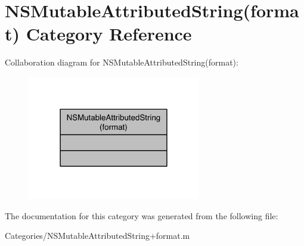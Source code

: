 \hypertarget{category_n_s_mutable_attributed_string_07format_08}{\section{N\-S\-Mutable\-Attributed\-String(format) Category Reference}
\label{category_n_s_mutable_attributed_string_07format_08}
}


Collaboration diagram for N\-S\-Mutable\-Attributed\-String(format)\-:
\nopagebreak
\begin{figure}[H]
\begin{center}
\leavevmode
\includegraphics[width=214pt]{category_n_s_mutable_attributed_string_07format_08__coll__graph}
\end{center}
\end{figure}


The documentation for this category was generated from the following file\-:\begin{DoxyCompactItemize}
\item 
Categories/N\-S\-Mutable\-Attributed\-String+format.\-m\end{DoxyCompactItemize}
